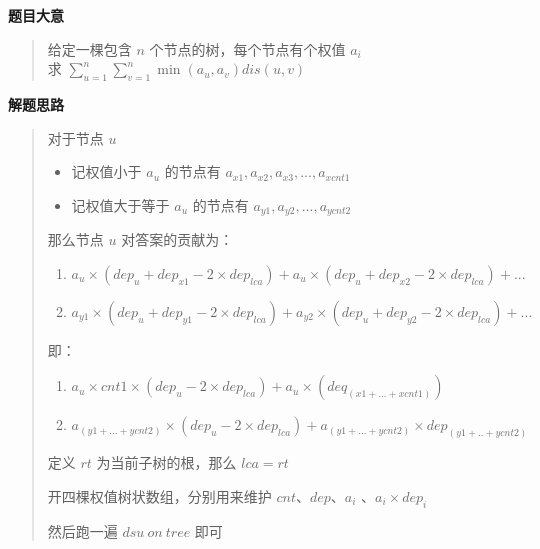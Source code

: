 \documentclass[E:/GsjzTle/main/main.tex]{subfiles}
\begin{document}
\textbf{题目大意}

\begin{quote}
给定一棵包含 \(n\) 个节点的树，每个节点有个权值 \(a_i\)\\
求 \(\sum_{u=1}^n\sum_{v=1}^n\min(a_u,a_v)dis(u,v)\)
\end{quote}

\textbf{解题思路}

\begin{quote}
对于节点 \(u\)

\begin{itemize}
\item
  记权值小于 \(a_u\) 的节点有 \(a_{x1},a_{x2},a_{x3},...,a_{xcnt1}\)
\item
  记权值大于等于 \(a_u\) 的节点有 \(a_{y1},a_{y2},...,a_{ycnt2}\)
\end{itemize}

那么节点 \(u\) 对答案的贡献为：

\begin{enumerate}
\def\labelenumi{\arabic{enumi}.}
\item
  \(a_u\times(dep_u + dep_{x1} - 2\times dep_{lca})+a_u\times(dep_u + dep_{x2} - 2\times dep_{lca})+...\)
\item
  \(a_{y1}\times(dep_u + dep_{y1} - 2\times dep_{lca})+a_{y2}\times(dep_u + dep_{y2} - 2\times dep_{lca})+...\)
\end{enumerate}

即：

\begin{enumerate}
\def\labelenumi{\arabic{enumi}.}
\item
  \(a_u\times cnt1\times (dep_u -2\times dep_{lca}) + a_u\times(deq_{(x1+...+xcnt1)})\)
\item
  \(a_{(y1+...+ycnt2)}\times (dep_u - 2\times dep_{lca})+a_{(y1+...+ycnt2)}\times dep_{(y1+..+ycnt2)}\)
\end{enumerate}

定义 \(rt\) 为当前子树的根，那么 \(lca = rt\)

开四棵权值树状数组，分别用来维护 \(cnt\)、\(dep\)、\(a_i\)
、\(a_i\times dep_i\)

然后跑一遍 \(dsu~on~tree\) 即可
\end{quote}
\end{document}
